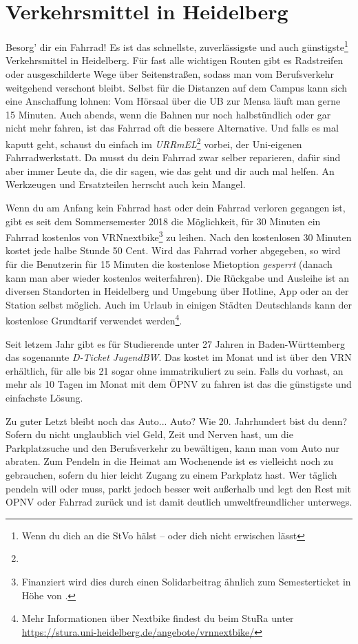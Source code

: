 \section{Verkehrsmittel in Heidelberg}
\label{verkehrsmittel}

Besorg' dir ein Fahrrad! Es ist das schnellste, zuverlässigste und auch günstigste\footnote{Wenn du dich an die StVo hälst -- oder dich nicht erwischen lässt} Verkehrsmittel in Heidelberg. Für fast alle wichtigen Routen gibt es Radstreifen oder ausgeschilderte Wege über Seitenstraßen, sodass man vom Berufsverkehr weitgehend verschont bleibt. Selbst für die Distanzen auf dem Campus kann sich eine Anschaffung lohnen: Vom Hörsaal über die \gls{UB} zur Mensa läuft man gerne 15 Minuten. Auch abends, wenn die Bahnen nur noch halbstündlich oder gar nicht mehr fahren, ist das Fahrrad oft die bessere Alternative. Und falls es mal kaputt geht, schaust du einfach im \emph{URRmEL}\footnote{\urrmelOeff} vorbei, der Uni-eigenen Fahrradwerkstatt. Da musst du dein Fahrrad zwar selber reparieren, dafür sind aber immer Leute da, die dir sagen, wie das geht und dir auch mal helfen. An Werkzeugen und Ersatzteilen herrscht auch kein Mangel.

\label{nextbike}
Wenn du am Anfang kein Fahrrad hast oder dein Fahrrad verloren gegangen ist, gibt es seit dem Sommersemester 2018 die Möglichkeit, für 30 Minuten ein Fahrrad kostenlos von VRNnextbike\footnote{Finanziert wird dies durch einen Solidarbeitrag ähnlich zum Semesterticket in Höhe von \EUR{\vrnextbikebeitrag}.} zu leihen. Nach den kostenlosen 30 Minuten kostet jede halbe Stunde 50 Cent. Wird das Fahrrad vorher abgegeben, so wird für die Benutzerin für 15 Minuten die kostenlose Mietoption \emph{gesperrt} (danach kann man aber wieder kostenlos weiterfahren). Die Rückgabe und Ausleihe ist an diversen Standorten in Heidelberg und Umgebung über Hotline, App oder an der Station selbst möglich. Auch im Urlaub in einigen Städten Deutschlands kann der kostenlose Grundtarif verwendet werden\footnote{Mehr Informationen über Nextbike findest du beim StuRa unter \url{https://stura.uni-heidelberg.de/angebote/vrnnextbike/}}.

Seit letzem Jahr gibt es für Studierende unter 27 Jahren in Baden-Württemberg das sogenannte \emph{D-Ticket JugendBW}. Das kostet  im Monat und ist über den VRN erhältlich, für alle bis 21 sogar ohne immatrikuliert zu sein. Falls du vorhast, an mehr als 10 Tagen im Monat mit dem ÖPNV zu fahren ist das die günstigste und einfachste Lösung.


Zu guter Letzt bleibt noch das Auto... Auto? Wie 20. Jahrhundert bist du denn? Sofern du nicht unglaublich viel Geld, Zeit und Nerven hast, um die Parkplatzsuche und den Berufsverkehr zu bewältigen, kann man vom Auto nur abraten. Zum Pendeln in die Heimat am Wochenende ist es vielleicht noch zu gebrauchen, sofern du hier leicht Zugang zu einem Parkplatz hast. Wer täglich pendeln will oder muss, parkt jedoch besser weit außerhalb und legt den Rest mit OPNV oder Fahrrad zurück und ist damit deutlich umweltfreundlicher unterwegs.
